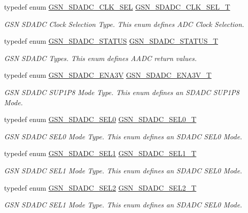 \begin{DoxyCompactItemize}
typedef enum \hyperlink{a00652_gac143749cf1a15e188558bc6ac9d32de2}{GSN\_\-SDADC\_\-CLK\_\-SEL} \hyperlink{a00652_ga3e84e460cc728aac5ff89621cc0ede91}{GSN\_\-SDADC\_\-CLK\_\-SEL\_\-T}
\begin{DoxyCompactList}\small\item\em GSN SDADC Clock Selection Type. This enum defines ADC Clock Selection. \end{DoxyCompactList}\item 
typedef enum \hyperlink{a00652_ga179a090b2c7d55f208c9a4a6c79eda05}{GSN\_\-SDADC\_\-STATUS} \hyperlink{a00652_ga36cbafd55d35763f491d3ba72f61ca51}{GSN\_\-SDADC\_\-STATUS\_\-T}
\begin{DoxyCompactList}\small\item\em GSN SDADC Types. This enum defines AADC return values. \end{DoxyCompactList}\item 
typedef enum \hyperlink{a00652_ga30a4571db8d9a123a6c9cf0f5c3c1146}{GSN\_\-SDADC\_\-ENA3V} \hyperlink{a00652_ga7c75febfa676ff7198e6665692e07c61}{GSN\_\-SDADC\_\-ENA3V\_\-T}
\begin{DoxyCompactList}\small\item\em GSN SDADC SUP1P8 Mode Type. This enum defines an SDADC SUP1P8 Mode. \end{DoxyCompactList}\item 
typedef enum \hyperlink{a00652_ga033785abce307d457533dfa53b59d84b}{GSN\_\-SDADC\_\-SEL0} \hyperlink{a00652_ga1211f3eac3c8c6697324a356da4dbcb7}{GSN\_\-SDADC\_\-SEL0\_\-T}
\begin{DoxyCompactList}\small\item\em GSN SDADC SEL0 Mode Type. This enum defines an SDADC SEL0 Mode. \end{DoxyCompactList}\item 
typedef enum \hyperlink{a00652_ga7881f6f750388de2816384904fafac2a}{GSN\_\-SDADC\_\-SEL1} \hyperlink{a00652_ga851e1269993bbdc128b392fd7216ade7}{GSN\_\-SDADC\_\-SEL1\_\-T}
\begin{DoxyCompactList}\small\item\em GSN SDADC SEL1 Mode Type. This enum defines an SDADC SEL0 Mode. \end{DoxyCompactList}\item 
typedef enum \hyperlink{a00652_gad596a4cc54081bcce130d18d07fd701a}{GSN\_\-SDADC\_\-SEL2} \hyperlink{a00652_ga21776f699fb060e738c464107e435df4}{GSN\_\-SDADC\_\-SEL2\_\-T}
\begin{DoxyCompactList}\small\item\em GSN SDADC SEL1 Mode Type. This enum defines an SDADC SEL0 Mode. \end{DoxyCompactList}\item 

\end{DoxyCompactItemize}
